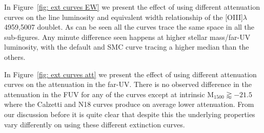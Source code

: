 In Figure~\ref{fig: ext curves EW} we present the effect of using different attenuation curves on the line luminosity and equivalent width relationship of the [OIII]$\lambda$4959,5007 doublet. As can be seen all the curves trace the same space in all the sub-figures. Any minute difference seen happens at higher stellar mass/far-UV luminosity, with the default and SMC curve tracing a higher median than the others.

In Figure~\ref{fig: ext curves att} we present the effect of using different attenuation curves on the attenuation in the far-UV. There is no observed difference in the attenuation in the FUV for any of the curves except at intrinsic M$_{1500}\gtrapprox-21.5$ where the Calzetti and N18 curves produce on average lower attenuation. From our discussion before it is quite clear that despite this the underlying properties vary differently on using these different extinction curves. 

